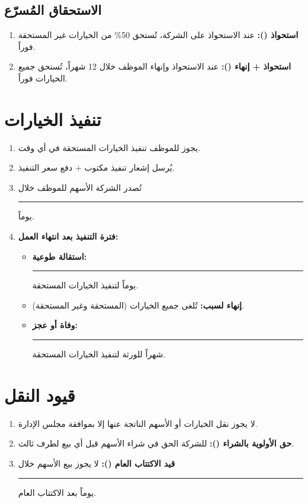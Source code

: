 \documentclass[11pt,a4paper]{article}
\begin{document}
\subsection{الاستحقاق المُسرّع}
\begin{enumerate}
    \item \textbf{استحواذ ():} عند الاستحواذ على الشركة، تُستحق 50\% من الخيارات غير المستحقة فوراً.
    \item \textbf{استحواذ + إنهاء ():} عند الاستحواذ وإنهاء الموظف خلال 12 شهراً، تُستحق جميع الخيارات فوراً.
\end{enumerate}

\section{تنفيذ الخيارات}
\label{sec:exercise}
\begin{enumerate}
    \item يجوز للموظف تنفيذ الخيارات المستحقة في أي وقت.
    \item يُرسل إشعار تنفيذ مكتوب + دفع سعر التنفيذ.
    \item تُصدر الشركة الأسهم للموظف خلال \rule{2cm}{0.4pt} يوماً.
    \item \textbf{فترة التنفيذ بعد انتهاء العمل:}
    \begin{itemize}
        \item \textbf{استقالة طوعية:} \rule{2cm}{0.4pt} يوماً لتنفيذ الخيارات المستحقة.
        \item \textbf{إنهاء لسبب:} تُلغى جميع الخيارات (المستحقة وغير المستحقة).
        \item \textbf{وفاة أو عجز:} \rule{2cm}{0.4pt} شهراً للورثة لتنفيذ الخيارات المستحقة.
    \end{itemize}
\end{enumerate}

\section{قيود النقل}
\label{sec:transfer}
\begin{enumerate}
    \item لا يجوز نقل الخيارات أو الأسهم الناتجة عنها إلا بموافقة مجلس الإدارة.
    \item \textbf{حق الأولوية بالشراء ():} للشركة الحق في شراء الأسهم قبل أي بيع لطرف ثالث.
    \item \textbf{قيد الاكتتاب العام ():} لا يجوز بيع الأسهم خلال \rule{2cm}{0.4pt} يوماً بعد الاكتتاب العام.
\end{enumerate}
\end{document}
